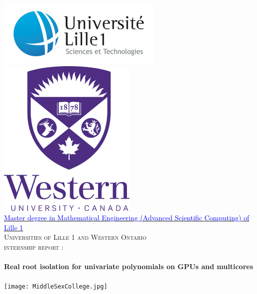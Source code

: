 \begin{titlepage}

\begin{center}


\includegraphics[scale = 0.6]{Logolille1.jpg}
\hspace{6.4cm}
\includegraphics[scale = 0.3]{LogoUWO.png}
\\[1cm]    


\href{http://mathematiques.univ-lille1.fr/Formation/Masters-de-l-UFR-de-Mathematiques/Masters-ingenierie-mathematiques/Master-2-specialite-scientific-computing/}{\large \textcolor{blue}{Master degree in Mathematical Engineering (Advanced Scientific
Computing) of Lille 1}}\\[0.7cm]
\textsc{\LARGE Universities of Lille 1 and Western Ontario}\\[1cm]

\textsc{\Large internship report :}\\[0.3cm]


\HRule \\[0.4cm]
{ \huge \bfseries Real root isolation for univariate polynomials on GPUs and multicores}\\[0.4cm]

\HRule \\[1cm]

\texttt{[image: MiddleSexCollege.jpg]}\\[1.5cm]


\end{center}
\end{titlepage}
